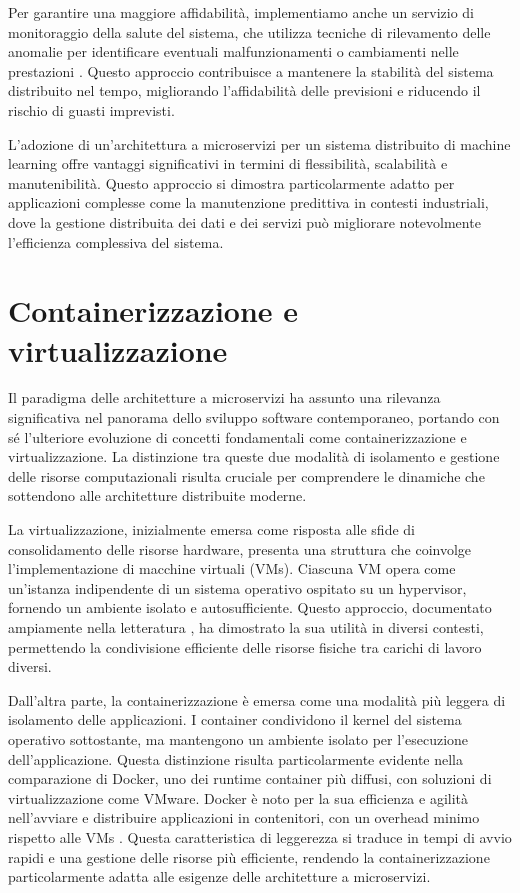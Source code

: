 Per garantire una maggiore affidabilità, implementiamo anche un servizio di monitoraggio della salute del sistema, che utilizza tecniche di rilevamento delle anomalie per identificare eventuali malfunzionamenti o cambiamenti nelle prestazioni \cite{ding2019using}. Questo approccio contribuisce a mantenere la stabilità del sistema distribuito nel tempo, migliorando l'affidabilità delle previsioni e riducendo il rischio di guasti imprevisti.

L'adozione di un'architettura a microservizi per un sistema distribuito di machine learning offre vantaggi significativi in termini di flessibilità, scalabilità e manutenibilità. Questo approccio si dimostra particolarmente adatto per applicazioni complesse come la manutenzione predittiva in contesti industriali, dove la gestione distribuita dei dati e dei servizi può migliorare notevolmente l'efficienza complessiva del sistema.

\section{Containerizzazione e virtualizzazione}

Il paradigma delle architetture a microservizi ha assunto una rilevanza significativa nel panorama dello sviluppo software contemporaneo, portando con sé l'ulteriore evoluzione di concetti fondamentali come containerizzazione e virtualizzazione. La distinzione tra queste due modalità di isolamento e gestione delle risorse computazionali risulta cruciale per comprendere le dinamiche che sottendono alle architetture distribuite moderne.

La virtualizzazione, inizialmente emersa come risposta alle sfide di consolidamento delle risorse hardware, presenta una struttura che coinvolge l'implementazione di macchine virtuali (VMs). Ciascuna VM opera come un'istanza indipendente di un sistema operativo ospitato su un hypervisor, fornendo un ambiente isolato e autosufficiente. Questo approccio, documentato ampiamente nella letteratura \cite{smith2005history}, ha dimostrato la sua utilità in diversi contesti, permettendo la condivisione efficiente delle risorse fisiche tra carichi di lavoro diversi.

Dall'altra parte, la containerizzazione è emersa come una modalità più leggera di isolamento delle applicazioni. I container condividono il kernel del sistema operativo sottostante, ma mantengono un ambiente isolato per l'esecuzione dell'applicazione. Questa distinzione risulta particolarmente evidente nella comparazione di Docker, uno dei runtime container più diffusi, con soluzioni di virtualizzazione come VMware. Docker è noto per la sua efficienza e agilità nell'avviare e distribuire applicazioni in contenitori, con un overhead minimo rispetto alle VMs \cite{turnbull2014docker}. Questa caratteristica di leggerezza si traduce in tempi di avvio rapidi e una gestione delle risorse più efficiente, rendendo la containerizzazione particolarmente adatta alle esigenze delle architetture a microservizi.

